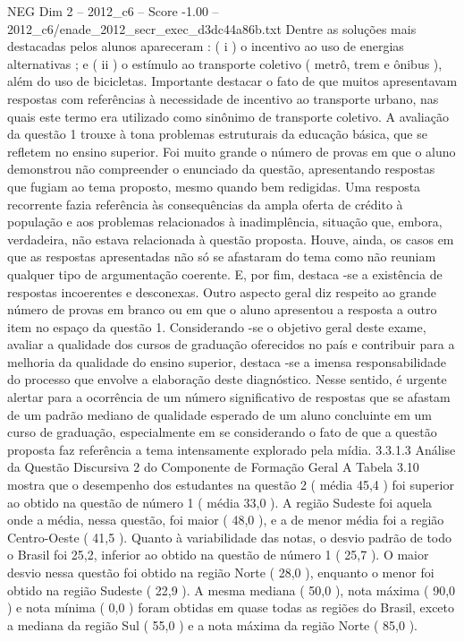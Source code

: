 \begin{textsample}{NEG Dim 2 – 2012\_c6 – Score -1.00 – 2012\_c6/enade\_2012\_secr\_exec\_d3dc44a86b.txt}
Dentre as soluções mais destacadas pelos alunos apareceram : ( i ) o incentivo ao uso de energias alternativas ; e ( ii ) o estímulo ao transporte coletivo ( metrô, trem e ônibus ), além do uso de bicicletas.
Importante destacar o fato de que muitos apresentavam respostas com referências à necessidade de incentivo ao transporte urbano, nas quais este termo era utilizado como sinônimo de transporte coletivo.
A avaliação da questão 1 trouxe à tona problemas estruturais da educação básica, que se refletem no ensino superior.
Foi muito grande o número de provas em que o aluno demonstrou não compreender o enunciado da questão, apresentando respostas que fugiam ao tema proposto, mesmo quando bem redigidas.
Uma resposta recorrente fazia referência às consequências da ampla oferta de crédito à população e aos problemas relacionados à inadimplência, situação que, embora, verdadeira, não estava relacionada à questão proposta.
Houve, ainda, os casos em que as respostas apresentadas não só se afastaram do tema como não reuniam qualquer tipo de argumentação coerente.
E, por fim, destaca -se a existência de respostas incoerentes e desconexas.
Outro aspecto geral diz respeito ao grande número de provas em branco ou em que o aluno apresentou a resposta a outro item no espaço da questão 1.
Considerando -se o objetivo geral deste exame, avaliar a qualidade dos cursos de graduação oferecidos no país e contribuir para a melhoria da qualidade do ensino superior, destaca -se a imensa responsabilidade do processo que envolve a elaboração deste diagnóstico.
Nesse sentido, é urgente alertar para a ocorrência de um número significativo de respostas que se afastam de um padrão mediano de qualidade esperado de um aluno concluinte em um curso de graduação, especialmente em se considerando o fato de que a questão proposta faz referência a tema intensamente explorado pela mídia. 3.3.1.3 Análise da Questão Discursiva 2 do Componente de Formação Geral A Tabela 3.10 mostra que o desempenho dos estudantes na questão 2 ( média 45,4 ) foi superior ao obtido na questão de número 1 ( média 33,0 ).
A região Sudeste foi aquela onde a média, nessa questão, foi maior ( 48,0 ), e a de menor média foi a região Centro-Oeste ( 41,5 ).
Quanto à variabilidade das notas, o desvio padrão de todo o Brasil foi 25,2, inferior ao obtido na questão de número 1 ( 25,7 ).
O maior desvio nessa questão foi obtido na região Norte ( 28,0 ), enquanto o menor foi obtido na região Sudeste ( 22,9 ).
A mesma mediana ( 50,0 ), nota máxima ( 90,0 ) e nota mínima ( 0,0 ) foram obtidas em quase todas as regiões do Brasil, exceto a mediana da região Sul ( 55,0 ) e a nota máxima da região Norte ( 85,0 ).

\end{textsample}
